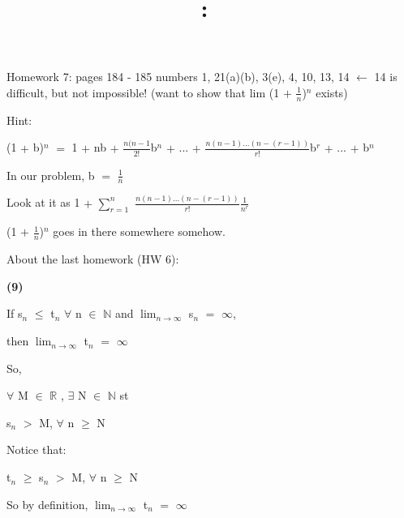 \documentclass{article}
\title{
    \vspace{2in}
    \textmd{\textbf{\hmwkClass:\ \hmwkTitle}}\\
    \normalsize\vspace{0.1in}\small\vspace{0.1in}\large{\textit{\hmwkClassInstructor}}
    \vspace{3in}
}
\author{\hmwkAuthorName}
\date{}
\newcommand{\mt}[1]{\ensuremath{#1}}
\newcommand{\bpth}[1]{\textbf{(#1)}}
\newcommand{\br}{\mt{\mathbb{R}} }       %
\newcommand{\bn}{\mt{\mathbb{N}} }       %
\newcommand{\fa}{\mt{\forall} }          %
\newcommand{\mem}{\mt{\in} }
\newcommand{\exs}{\mt{\exists} }
\newcommand{\lla}{ \mt{\longleftarrow} }  %
\newcommand{\prn}[1]{(#1)}
\newcommand{\ps}{\mt{+} }
\newcommand{\gr}{\mt{>} }
\newcommand{\lse}{\mt{\leq} }
\newcommand{\gre}{\mt{\geq} }
\newcommand{\eql}{\mt{=} }
\newcommand{\uw}[2]{#1\mt{_{#2}}}
\newcommand{\uf}[2]{#1\mt{^{#2}}}
\newcommand{\frc}[2]{\mt{\frac{#1}{#2}}}
\newcommand{\lmti}[1]{\mt{\displaystyle{\lim_{#1 \to \infty}}}}
\begin{document}
Homework 7: pages 184 - 185 numbers 1, 21(a)(b), 3(e), 4, 10, 13, 14 \lla 14 is difficult, but not impossible! (want to show that lim (1 \ps \frc{1}{n})$^n$ exists)

Hint:

\uf{\prn{1 \ps b}}{n} \eql 1 \ps nb \ps \frc{n(n - 1}{2!}\uf{b}{n} \ps ... \ps \frc{n(n - 1)... (n - (r - 1))}{r!}\uf{b}{r} \ps ... \ps \uf{b}{n}

In our problem, b \eql \frc{1}{n}

Look at it as 1 \ps $\sum_{r = 1}^n$ \frc{n(n - 1)...(n - (r - 1))}{r!}\frc{1}{n^r}

\prn{1 \ps \frc{1}{n}}$^n$ goes in there somewhere somehow.

About the last homework (HW 6):

\bpth{9}

If \uw{s}{n} \lse \uw{t}{n} \fa n \mem \bn and \lmti{n} \uw{s}{n} \eql $\infty$,

then \lmti{n} \uw{t}{n} \eql $\infty$

So,

\fa M \mem \br, \exs N \mem \bn st

\uw{s}{n} \gr M, \fa n \gre N

Notice that:

\uw{t}{n} \gre \uw{s}{n} \gr M, \fa n \gre N

So by definition, \lmti{n} \uw{t}{n} \eql $\infty$
\end{document}
